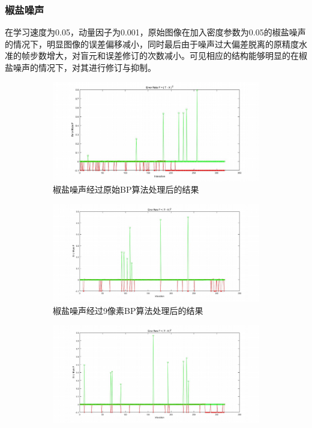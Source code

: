 \documentclass{article}
\newcounter{sub}
\begin{document}
\subsubsection{椒盐噪声}%
\label{ssub:椒盐噪声}

在学习速度为0.05，动量因子为0.001，原始图像在加入密度参数为0.05的椒盐噪声的情况下，明显图像的误差偏移减小，同时最后由于噪声过大偏差脱离的原精度水准的帧步数增大，对盲元和误差修订的次数减小。可见相应的结构能够明显的在椒盐噪声的情况下，对其进行修订与抑制。

\begin{figure}[htpb]
	\centering
	\begin{subfigure}[htpb]{.45\linewidth}
		\centering
		\includegraphics[width=\linewidth]{salt-5.png}
		\caption{椒盐噪声经过原始BP算法处理后的结果}
		\label{fig:椒盐噪声经过原始BP算法处理后的结果}
	\end{subfigure}
	\quad
	\begin{subfigure}[htpb]{.45\linewidth}
		\centering
		\includegraphics[width=\linewidth]{salt-9.png}
		\caption{椒盐噪声经过9像素BP算法处理后的结果}
		\label{fig:椒盐噪声经过9像素BP算法处理后的结果}
	\end{subfigure}
	\quad
	\begin{subfigure}[htpb]{.45\linewidth}
		\centering
		\includegraphics[width=\linewidth]{salt-13.png}

\end{subfigure}
\end{figure}
\end{document}
